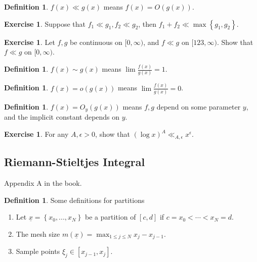 \documentclass[11pt]{article}
\theoremstyle{definition}
\newtheorem{defn}[thm]{Definition}
\newtheorem{exe}[thm]{Exercise}
\newcommand{\set}[1]{\left\{ #1 \right\}}
\begin{document}
\begin{defn}
$f(x)\ll g(x)$ means $f(x)=O(g(x))$.
\end{defn}

\begin{exe}
Suppose that $f_1\ll g_1, f_2\ll g_2$, then $f_1+f_2\ll\max\set{g_1,g_2}$. \checkmark
\end{exe}

\begin{exe}
Let $f,g$ be continuous on $[0,\infty)$, and $f\ll g$ on $[123,\infty)$. Show that $f\ll g$
on $[0,\infty)$. \checkmark
\end{exe}

\begin{defn}
$f(x)\sim g(x)$ means $\lim\frac{f(x)}{g(x)}=1$.
\end{defn}

\begin{defn}
$f(x)=o(g(x))$ means $\lim\frac{f(x)}{g(x)}=0$.
\end{defn}

\begin{defn}
$f(x)=O_y(g(x))$ means $f,g$ depend on some parameter $y$, and the implicit constant
depends on $y$.
\end{defn}

\begin{exe}
For any $A,\epsilon>0$, show that $(\log x)^A \ll_{A,\epsilon} x^\epsilon$.
\end{exe}


\subsection{Riemann-Stieltjes Integral}

Appendix A in the book.

\begin{defn}
Some definitions for partitions
\begin{enumerate}
\item Let $\underline{x}=\set{x_0,...,x_N}$ be a partition of $[c,d]$ if
$c=x_0<\cdots<x_N=d$.
\item The mesh size $m(\underline{x})=\max_{1\le j\le N} x_j-x_{j-1}$.
\item Sample points $\xi_j\in[x_{j-1},x_j]$.
\end{enumerate}
\end{defn}
\end{document}
